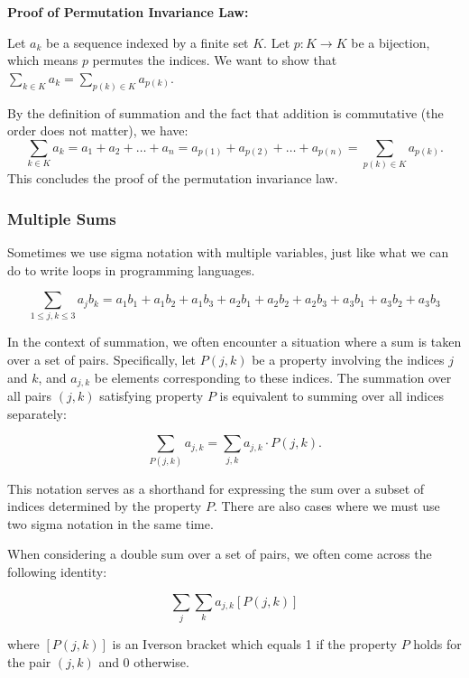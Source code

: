 \documentclass[
	12pt, %
	fleqn, %
	a4paper, %
]{LegrandOrangeBook}
\begin{document}
\textbf{Proof of Permutation Invariance Law:}

Let \( a_k \) be a sequence indexed by a finite set \( K \). Let \( p: K \to K \) be a bijection, which means \( p \) permutes the indices. We want to show that \( \sum_{k \in K} a_k = \sum_{p(k) \in K} a_{p(k)} \).

By the definition of summation and the fact that addition is commutative (the order does not matter), we have:
\begin{equation}
    \sum_{k \in K} a_k = a_1 + a_2 + \ldots + a_n = a_{p(1)} + a_{p(2)} + \ldots + a_{p(n)} = \sum_{p(k) \in K} a_{p(k)}.
\end{equation}
This concludes the proof of the permutation invariance law.
\subsubsection{Multiple Sums}
Sometimes we use sigma notation with multiple variables, just like what we can do to write loops in programming languages.

    
$$\sum_{1 \leq j, k \leq 3} a_j b_k = a_1b_1 + a_1b_2 + a_1b_3 + a_2b_1 + a_2b_2 + a_2b_3 + a_3b_1 + a_3b_2 + a_3b_3 $$


In the context of summation, we often encounter a situation where a sum is taken over a set of pairs. Specifically, let \( P(j, k) \) be a property involving the indices \( j \) and \( k \), and \( a_{j,k} \) be elements corresponding to these indices. The summation over all pairs \( (j, k) \) satisfying property \( P \) is equivalent to summing over all indices separately:

\[
\sum_{P(j,k)} a_{j,k} = \sum_{j,k} a_{j,k} \cdot P(j,k).
\]

This notation serves as a shorthand for expressing the sum over a subset of indices determined by the property \( P \).
There are also cases where we must use two sigma notation in the same time.

 
\begin{example}
    When considering a double sum over a set of pairs, we often come across the following identity:

\begin{equation}
\sum_{j}\sum_{k} a_{j,k} [P(j,k)]
\end{equation}

where \( [P(j,k)] \) is an Iverson bracket which equals 1 if the property \( P \) holds for the pair \( (j,k) \) and 0 otherwise.
\end{example}
\end{document}
